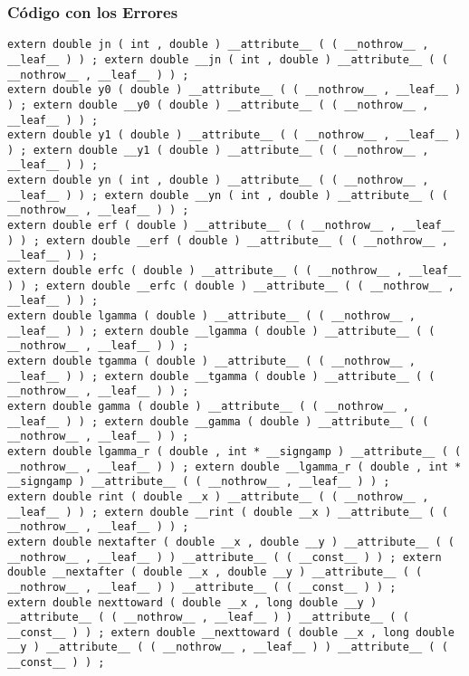 \documentclass{beamer}
\begin{document}
\begin{frame}[fragile]
\frametitle{C\'odigo con los Errores}
\begin{verbatim}
extern double jn ( int , double ) __attribute__ ( ( __nothrow__ , __leaf__ ) ) ; extern double __jn ( int , double ) __attribute__ ( ( __nothrow__ , __leaf__ ) ) ; 
extern double y0 ( double ) __attribute__ ( ( __nothrow__ , __leaf__ ) ) ; extern double __y0 ( double ) __attribute__ ( ( __nothrow__ , __leaf__ ) ) ; 
extern double y1 ( double ) __attribute__ ( ( __nothrow__ , __leaf__ ) ) ; extern double __y1 ( double ) __attribute__ ( ( __nothrow__ , __leaf__ ) ) ; 
extern double yn ( int , double ) __attribute__ ( ( __nothrow__ , __leaf__ ) ) ; extern double __yn ( int , double ) __attribute__ ( ( __nothrow__ , __leaf__ ) ) ; 
extern double erf ( double ) __attribute__ ( ( __nothrow__ , __leaf__ ) ) ; extern double __erf ( double ) __attribute__ ( ( __nothrow__ , __leaf__ ) ) ; 
extern double erfc ( double ) __attribute__ ( ( __nothrow__ , __leaf__ ) ) ; extern double __erfc ( double ) __attribute__ ( ( __nothrow__ , __leaf__ ) ) ; 
extern double lgamma ( double ) __attribute__ ( ( __nothrow__ , __leaf__ ) ) ; extern double __lgamma ( double ) __attribute__ ( ( __nothrow__ , __leaf__ ) ) ; 
extern double tgamma ( double ) __attribute__ ( ( __nothrow__ , __leaf__ ) ) ; extern double __tgamma ( double ) __attribute__ ( ( __nothrow__ , __leaf__ ) ) ; 
extern double gamma ( double ) __attribute__ ( ( __nothrow__ , __leaf__ ) ) ; extern double __gamma ( double ) __attribute__ ( ( __nothrow__ , __leaf__ ) ) ; 
extern double lgamma_r ( double , int * __signgamp ) __attribute__ ( ( __nothrow__ , __leaf__ ) ) ; extern double __lgamma_r ( double , int * __signgamp ) __attribute__ ( ( __nothrow__ , __leaf__ ) ) ; 
extern double rint ( double __x ) __attribute__ ( ( __nothrow__ , __leaf__ ) ) ; extern double __rint ( double __x ) __attribute__ ( ( __nothrow__ , __leaf__ ) ) ; 
extern double nextafter ( double __x , double __y ) __attribute__ ( ( __nothrow__ , __leaf__ ) ) __attribute__ ( ( __const__ ) ) ; extern double __nextafter ( double __x , double __y ) __attribute__ ( ( __nothrow__ , __leaf__ ) ) __attribute__ ( ( __const__ ) ) ; 
extern double nexttoward ( double __x , long double __y ) __attribute__ ( ( __nothrow__ , __leaf__ ) ) __attribute__ ( ( __const__ ) ) ; extern double __nexttoward ( double __x , long double __y ) __attribute__ ( ( __nothrow__ , __leaf__ ) ) __attribute__ ( ( __const__ ) ) ; 
\end{verbatim}
\end{frame}
\end{document}
